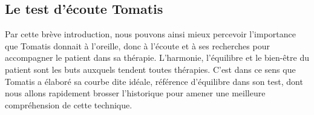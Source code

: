 
\subsection{Le test d'écoute Tomatis}
Par cette brève introduction, nous pouvons ainsi mieux percevoir l'importance que Tomatis donnait à l'oreille, donc à l'écoute et à ses recherches pour accompagner le patient dans sa thérapie.
L'harmonie, l'équilibre et le bien-être du patient sont les buts auxquels tendent  toutes thérapies. C'est 
dans ce sens que Tomatis a élaboré sa courbe dite idéale, référence d'équilibre dans son test, dont nous 
allons rapidement brosser l'historique pour amener une meilleure compréhension de cette technique.

